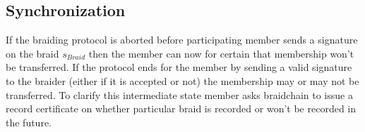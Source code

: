 \documentclass[12pt]{article}
\begin{document}

\subsection*{Synchronization}

If the braiding protocol is aborted before participating member sends a signature on the braid $s_{Braid}$ then the member can now for certain that membership won't be transferred. If the protocol ends for the member by sending a valid signature to the braider (either if it is accepted or not) the membership may or may not be transferred. To clarify this intermediate state member asks braidchain to issue a record certificate on whether particular braid is recorded or won't be recorded in the future. 
\end{document}
